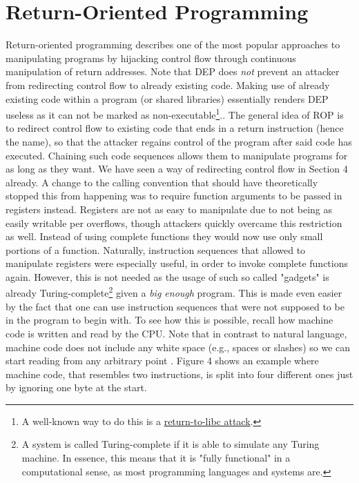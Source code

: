 \documentclass[10pt,twocolumn,a4paper]{article}
\begin{document}
\section{Return-Oriented Programming}\label{ROP}
Return-oriented programming describes one of the most popular approaches to manipulating programs by hijacking control flow through continuous manipulation of return addresses.
Note that DEP does \emph{not} prevent an attacker from redirecting control flow to already existing code.
Making use of already existing code within a program (or shared libraries) essentially renders DEP useless as it can not be marked as non-executable\cite{solar}\footnote{A well-known way to do this is a \hyperref{https://en.wikipedia.org/wiki/Return-to-libc_attack}{Return-to-Libc Exploits}{name}{return-to-libc attack}.}..
The general idea of ROP is to redirect control flow to existing code that ends in a return instruction (hence the name), so that the attacker regains control of the program after said code has executed. Chaining such code sequences allows them to manipulate programs for as long as they want.
We have seen a way of redirecting control flow in Section 4 already.
A change to the calling convention that should have theoretically stopped this from happening was to require function arguments to be passed in registers instead\cite{calling}. Registers are not as easy to manipulate due to not being as easily writable per overflows, though attackers quickly overcame this restriction as well.
Instead of using complete functions they would now use only small portions of a function\cite{krahmer}. Naturally, instruction sequences that allowed to manipulate registers were especially useful, in order to invoke complete functions again.
However, this is not needed as the usage of such so called "gadgets" is already Turing-complete\footnote{A system is called Turing-complete if it is able to simulate any Turing machine. In essence, this means that it is "fully functional" in a computational sense, as most programming languages and systems are\cite{Turing}.} given a \emph{big enough}\cite{gadgets} program.
This is made even easier by the fact that one can use instruction sequences that were not supposed to be in the program to begin with.
To see how this is possible, recall how machine code is written and read by the CPU.
Note that in contrast to natural language, machine code does not include any white space (e.g., spaces or slashes) so we can start reading from any arbitrary point \cite{gadgets}.
Figure 4 shows an example where machine code, that resembles two instructions, is split into four different ones just by ignoring one byte at the start.
\end{document}
